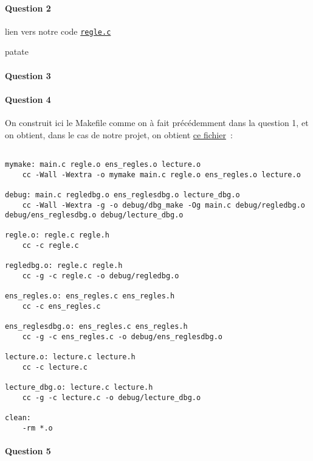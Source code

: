 \documentclass{article}
\begin{document}
\paragraph{Question 2}

lien vers notre code \texttt{\href{https://github.com/LostExcalibur/mymake/blob/master/regle.c}{regle.c}}

patate

\paragraph{Question 3}

\paragraph{Question 4}

On construit ici le Makefile comme on à fait précédemment dans la question 1, et on obtient, dans le cas de notre projet, on obtient \href{https://github.com/LostExcalibur/mymake/blob/master/Makefile}{ce fichier}~:

\begin{verbatim}

mymake: main.c regle.o ens_regles.o lecture.o
    cc -Wall -Wextra -o mymake main.c regle.o ens_regles.o lecture.o

debug: main.c regledbg.o ens_reglesdbg.o lecture_dbg.o
    cc -Wall -Wextra -g -o debug/dbg_make -Og main.c debug/regledbg.o debug/ens_reglesdbg.o debug/lecture_dbg.o

regle.o: regle.c regle.h
    cc -c regle.c

regledbg.o: regle.c regle.h
    cc -g -c regle.c -o debug/regledbg.o

ens_regles.o: ens_regles.c ens_regles.h
    cc -c ens_regles.c

ens_reglesdbg.o: ens_regles.c ens_regles.h
    cc -g -c ens_regles.c -o debug/ens_reglesdbg.o

lecture.o: lecture.c lecture.h
    cc -c lecture.c

lecture_dbg.o: lecture.c lecture.h
    cc -g -c lecture.c -o debug/lecture_dbg.o

clean:
    -rm *.o

\end{verbatim}

\paragraph{Question 5}
\end{document}
